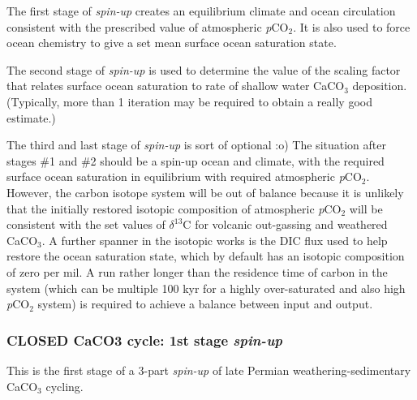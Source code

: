\documentclass[10pt,twoside]{article}
\begin{document}
        \begin{compactenum}
        
                \item The first stage of \textit{spin-up} creates an equilibrium climate and ocean circulation consistent with the prescribed value of atmospheric \textit{p}CO\(_{2}\). It is also used to force ocean chemistry to give a set mean surface ocean saturation state.
                
                \item The second stage of \textit{spin-up} is used to determine the value of the scaling factor that relates surface ocean saturation to rate of shallow water CaCO\(_{3}\) deposition. (Typically, more than 1 iteration may be required to obtain a really good estimate.)
                
                \item The third and last stage of \textit{spin-up} is sort of optional :o) The situation after stages \#1 and \#2 should be a spin-up ocean and climate, with the required surface ocean saturation in equilibrium with required atmospheric \textit{p}CO\(_{2}\). However, the carbon isotope system will be out of balance because it is unlikely that the initially restored isotopic composition of atmospheric \textit{p}CO\(_{2}\) will be consistent with the set values of \(\delta^{13}\)C for volcanic out-gassing and weathered CaCO\(_{3}\). A further spanner in the isotopic works is the DIC flux used to help restore the ocean saturation state, which by default has an isotopic composition of zero per mil. A run rather longer than the residence time of carbon in the system (which can be multiple 100 kyr for a highly over-saturated and also high \textit{p}CO\(_{2}\) system) is required to achieve a balance between input and output.
                
        \end{compactenum}


\subsubsection{CLOSED CaCO3 cycle: 1st stage \textit{spin-up}}\label{EXAMPLE.p0251b.PO4.SPIN0}

This is the first stage of a 3-part \textsl{spin-up} of late Permian weathering-sedimentary CaCO$_{3}$ cycling.
\end{document}
